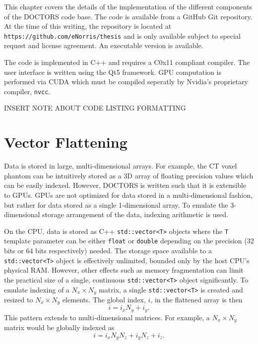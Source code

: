 
This chapter covers the details of the implementation of the different components of the DOCTORS code base. The code is available from a GitHub Git repository. At the time of this writing, the repository is located at \texttt{https://github.com/eNorris/thesis} and is only available subject to special request and license agreement. An executable version is available.

The code is implemented in C++ and requires a C0x11 compliant compiler. The user interface is written using the Qt5 framework. GPU computation is performed via CUDA which must be compiled seperatly by Nvidia's proprietary compiler, \texttt{nvcc}.

INSERT NOTE ABOUT CODE LISTING FORMATTING

\section{Vector Flattening}\label{sec:flatten}

Data is stored in large, multi-dimensional arrays. For example, the CT voxel phantom can be intuitively stored as a 3D array of floating precision values which can be easily indexed. However, DOCTORS is written such that it is extensible to GPUs. GPUs are not optimized for data stored in a multi-dimensional fashion, but rather for data stored as a single 1-dimensional array. To emulate the 3-dimensional storage arrangement of the data, indexing arithmetic is used.

On the CPU, data is stored as C++ \texttt{std::vector<T>} objects where the \texttt{T} template parameter can be either \texttt{float} or \texttt{double} depending on the precision (32 bits or 64 bits respectively) needed. The storage space available to a \texttt{std::vector<T>} object is effectively unlimited, bounded only by the host CPU's physical RAM. However, other effects such as memory fragmentation can limit the practical size of a single, continuous \texttt{std::vector<T>} object significantly. To emulate indexing of a $N_x \times N_y$ matrix, a single \texttt{std::vector<T>} is created and resized to $N_x \times N_y$ elements. The global index, $i$, in the flattened array is then
\begin{equation}
i = i_x N_y + i_y.
\end{equation}
This pattern extends to multi-dimensional matrices. For example, a $N_x \times N_y$ matrix would be globally indexed as
\begin{equation}
i = i_x N_y N_z + i_y N_z + i_z.
\end{equation}

